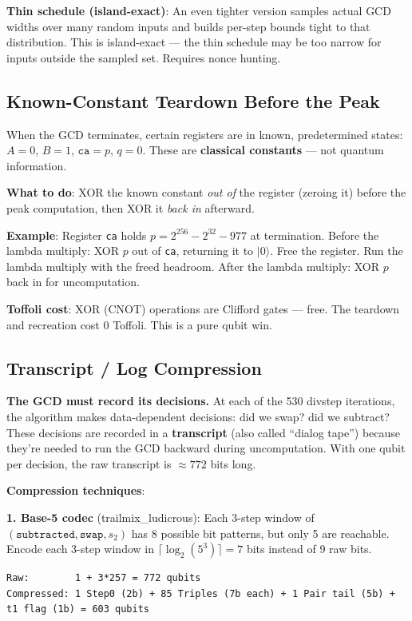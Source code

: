 \documentclass[11pt,a4paper]{article}
\newcommand{\ket}[1]{$|#1\rangle$\xspace}
\begin{document}
\textbf{Thin schedule (island-exact)}: An even tighter version samples actual GCD widths over many
random inputs and builds per-step bounds tight to that distribution. This is island-exact ---
the thin schedule may be too narrow for inputs outside the sampled set. Requires nonce hunting.

\subsection{Known-Constant Teardown Before the Peak}

When the GCD terminates, certain registers are in known, predetermined states: $A = 0$, $B = 1$,
$\texttt{ca} = p$, $q = 0$. These are \textbf{classical constants} --- not quantum information.

\textbf{What to do}: XOR the known constant \emph{out of} the register (zeroing it) before the
peak computation, then XOR it \emph{back in} afterward.

\textbf{Example}: Register \texttt{ca} holds $p = 2^{256} - 2^{32} - 977$ at termination. Before
the lambda multiply: XOR $p$ out of \texttt{ca}, returning it to \ket{0}. Free the register. Run
the lambda multiply with the freed headroom. After the lambda multiply: XOR $p$ back in for
uncomputation.

\textbf{Toffoli cost}: XOR (CNOT) operations are Clifford gates --- free.
The teardown and recreation cost 0 Toffoli. This is a pure qubit win.

\subsection{Transcript / Log Compression}
\label{sec:transcript}

\textbf{The GCD must record its decisions.} At each of the 530 divstep iterations, the algorithm
makes data-dependent decisions: did we swap? did we subtract? These decisions are recorded in a
\textbf{transcript} (also called ``dialog tape'') because they're needed to run the GCD backward
during uncomputation. With one qubit per decision, the raw transcript is $\approx772$ bits long.

\textbf{Compression techniques}:

\textbf{1. Base-5 codec} (trailmix\_ludicrous): Each 3-step window of $(\texttt{subtracted},
\texttt{swap}, s_2)$ has 8 possible bit patterns, but only 5 are reachable. Encode each 3-step
window in $\lceil \log_2(5^3) \rceil = 7$ bits instead of 9 raw bits.
\begin{lstlisting}
Raw:        1 + 3*257 = 772 qubits
Compressed: 1 Step0 (2b) + 85 Triples (7b each) + 1 Pair tail (5b) + t1 flag (1b) = 603 qubits
\end{lstlisting}
\end{document}
